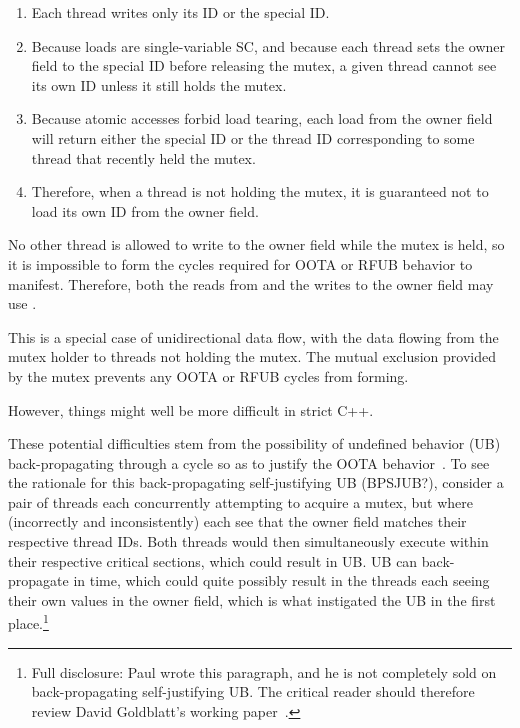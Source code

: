 \documentclass[10]{article}
\begin{document}
\begin{enumerate}
\item	Each thread writes only its ID or the special ID.
\item	Because  loads are single-variable
	SC, and because each thread sets the owner field to the special
	ID before releasing the mutex, a given thread cannot see its own
	ID unless it still holds the mutex.
\item	Because atomic accesses forbid load tearing, each load from
	the owner field will return either the special ID or the thread
	ID corresponding to some thread that recently held the mutex.
\item	Therefore, when a thread is not holding the mutex, it is guaranteed
	not to load its own ID from the owner field.
\end{enumerate}

No other thread is allowed to write to the owner field while the mutex
is held, so it is impossible to form the cycles required for OOTA or
RFUB behavior to manifest.
Therefore, both the reads from and the writes to the owner field
may use .

This is a special case of unidirectional data flow, with the data flowing
from the mutex holder to threads not holding the mutex.
The mutual exclusion provided by the mutex prevents any OOTA or RFUB
cycles from forming.


However, things might well be more difficult in strict C++.

These potential difficulties stem from the possibility of undefined
behavior (UB) back-propagating through a cycle so as to justify the OOTA
behavior~\cite{DavidGoldblatt2019NoElegantOOTA}.
To see the rationale for this back-propagating self-justifying UB (BPSJUB?),
consider a pair of threads each concurrently attempting to acquire a
mutex, but where (incorrectly and inconsistently) each see that the
owner field matches their respective thread IDs.
Both threads would then simultaneously execute within their respective
critical sections, which could result in UB.
UB can back-propagate in time, which could quite possibly result
in the threads each seeing their own values in the owner field, which
is what instigated the UB in the first place.\footnote{
	Full disclosure: Paul wrote this paragraph, and he is not
	completely sold on back-propagating self-justifying UB.
	The critical reader should therefore review David Goldblatt's
	working paper~\cite{DavidGoldblatt2019NoElegantOOTA}.}
\end{document}
